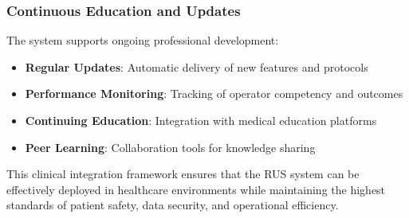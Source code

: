 \subsubsection{Continuous Education and Updates}
The system supports ongoing professional development:

\begin{itemize}
    \item \textbf{Regular Updates}: Automatic delivery of new features and protocols
    \item \textbf{Performance Monitoring}: Tracking of operator competency and outcomes
    \item \textbf{Continuing Education}: Integration with medical education platforms
    \item \textbf{Peer Learning}: Collaboration tools for knowledge sharing
\end{itemize}

This clinical integration framework ensures that the RUS system can be effectively deployed in healthcare environments while maintaining the highest standards of patient safety, data security, and operational efficiency.
